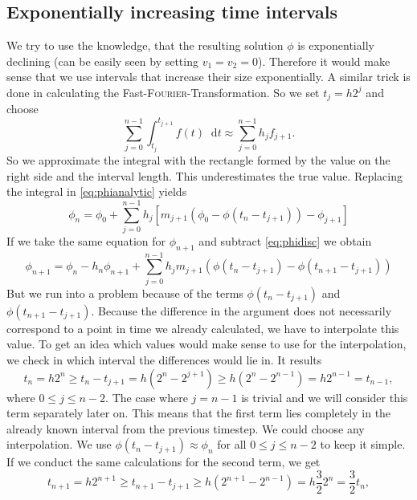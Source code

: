 \documentclass[12pt,a4paper,twoside, open=right]{scrreprt}
\theoremstyle{definition}
\theoremstyle{plain}
\newcommand{\D}{\mathop{}\!\mathrm{d}}
\begin{document}
\subsection{Exponentially increasing time intervals}
We try to use the knowledge, that the resulting solution $\phi$ is exponentially declining (can be easily seen by setting $v_1=v_2=0$). Therefore it would make sense that we use intervals that increase their size exponentially. A similar trick is done in calculating the Fast-\textsc{Fourier}-Transformation. So we set $t_j=h2^j$ and choose 
\begin{equation}
    \sum_{j=0}^{n-1}\int_{t_j}^{t_{j+1}}f(t)\D t\approx\sum_{j=0}^{n-1}h_jf_{j+1}.
\end{equation}
So we approximate the integral with the rectangle formed by the value on the right side and the interval length. This underestimates the true value. Replacing the integral in \eqref{eq:phianalytic} yields
\begin{equation}
    \phi_n = \phi_0 + \sum_{j=0}^{n-1}h_j[m_{j+1}(\phi_0-\phi(t_n-t_{j+1}))-\phi_{j+1}]\label{eq:phidisc}
\end{equation} 
If we take the same equation for $\phi_{n+1}$ and subtract \eqref{eq:phidisc} we obtain
\begin{equation}
    \phi_{n+1}= \phi_n -h_n\phi_{n+1}+\sum_{j=0}^{n-1}h_jm_{j+1}(\phi(t_n-t_{j+1})-\phi(t_{n+1}-t_{j+1}))\label{eq:phidiff}
\end{equation}
But we run into a problem because of the terms $\phi(t_n-t_{j+1})$ and $\phi(t_{n+1}-t_{j+1})$. Because the difference in the argument does not necessarily correspond to a point in time we already calculated, we have to interpolate this value. To get an idea which values would make sense to use for the interpolation, we check in which interval the differences would lie in. It results
\begin{equation}
    t_n =h2^n\ge t_n-t_{j+1}=h(2^n-2^{j+1})\ge h(2^n-2^{n-1}) =h2^{n-1}=t_{n-1},
\end{equation}
where $0\le j\le n-2$. The case where $j=n-1$ is trivial and we will consider this term separately later on.
This means that the first term lies completely in the already known interval from the previous timestep. We could choose any interpolation. We use $\phi(t_n-t_{j+1})\approx\phi_n$ for all $0\le j\le n-2$ to keep it simple. If we conduct the same calculations for the second term, we get
\begin{equation}
    t_{n+1}=h2^{n+1}\ge t_{n+1}-t_{j+1}\ge h(2^{n+1}-2^{n-1})=h\frac{3}{2}2^n=\frac{3}{2}t_n,
\end{equation}
\end{document}
